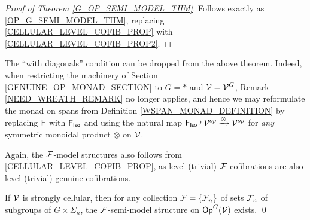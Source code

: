 \documentclass[a4paper,10pt]{article}%
\begin{document}
\begin{proof}[Proof of Theorem \ref{G_OP_SEMI_MODEL_THM}]
  Follows exactly as \ref{OP_G_SEMI_MODEL_THM}, replacing \ref{CELLULAR_LEVEL_COFIB_PROP} with \ref{CELLULAR_LEVEL_COFIB_PROP2}.  
\end{proof}



\begin{remark}
  The ``with diagonals'' condition can be dropped from the above theorem. Indeed, when restricting the machinery of Section \ref{GENUINE_OP_MONAD_SECTION} to $G = *$ and $\mathcal V = \mathcal V^G$, Remark \ref{NEED_WREATH_REMARK} no longer applies, and hence we may reformulate the monad on spans from Definition \ref{WSPAN_MONAD_DEFINITION} by replacing $\mathsf{F}$ with $\mathsf{F}_{\mathsf{Iso}}$ and using the natural map $\mathsf F_{\mathsf{Iso}} \wr \mathcal V^{op} \xrightarrow{\otimes} \mathcal V^{op}$ for \textit{any} symmetric monoidal product $\otimes$ on $\mathcal V$.
\end{remark}

Again, the $\mathcal F$-model structures also follows from \ref{CELLULAR_LEVEL_COFIB_PROP}, as level (trivial) $\mathcal F$-cofibrations are also level (trivial) genuine cofibrations.
\begin{corollary} 
  \label{F_OP_SEMI_MODEL_THM}
  If $\mathcal V$ is strongly cellular, then for any collection $\mathcal F = \left\{\mathcal F_n\right\}$ of sets $\mathcal F_n$ of subgroups of $G\times \Sigma_n$, the $\mathcal F$-semi-model structure on $\mathsf{Op}^G(\mathcal V)$ exists. \qed
\end{corollary} 
\end{document}
